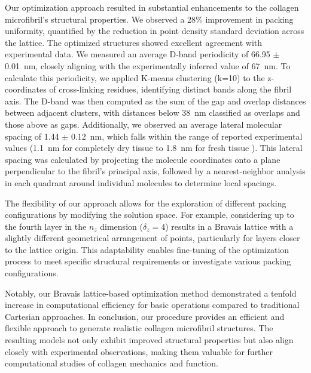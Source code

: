 \documentclass[10pt,letterpaper]{article}
\begin{document}
Our optimization approach resulted in substantial enhancements to the collagen microfibril's structural properties. We observed a 28\% improvement in packing uniformity, quantified by the reduction in point density standard deviation across the lattice. The optimized structures showed excellent agreement with experimental data. We measured an average D-band periodicity of \SI{66.95}{} \(\pm\) \SI{0.01}{\nano\meter}, closely aligning with the experimentally inferred value of \SI{67}{\nano\meter}. To calculate this periodicity, we applied K-means clustering \cite{macqueen1967some, pedregosa2011scikit} (k=10) to the z-coordinates of cross-linking residues, identifying distinct bands along the fibril axis. The D-band was then computed as the sum of the gap and overlap distances between adjacent clusters, with distances below \SI{38}{\nano\meter} classified as overlaps and those above as gaps. Additionally, we observed an average lateral molecular spacing of \SI{1.44}{} \(\pm\) \SI{0.12}{\nano\meter}, which falls within the range of reported experimental values (\SI{1.1}{\nano\meter} for completely dry tissue to \SI{1.8}{\nano\meter} for fresh tissue \cite{fratzl1993collagen}). This lateral spacing was calculated by projecting the molecule coordinates onto a plane perpendicular to the fibril's principal axis, followed by a nearest-neighbor analysis in each quadrant around individual molecules to determine local spacings. 

The flexibility of our approach allows for the exploration of different packing configurations by modifying the solution space. For example, considering up to the fourth layer in the \(n_z\) dimension (\(\delta_z=4\)) results in a Bravais lattice with a slightly different geometrical arrangement of points, particularly for layers closer to the lattice origin. This adaptability enables fine-tuning of the optimization process to meet specific structural requirements or investigate various packing configurations.

Notably, our Bravais lattice-based optimization method demonstrated a tenfold increase in computational efficiency for basic operations compared to traditional Cartesian approaches. In conclusion, our procedure provides an efficient and flexible approach to generate realistic collagen microfibril structures. The resulting models not only exhibit improved structural properties but also align closely with experimental observations, making them valuable for further computational studies of collagen mechanics and function.
\end{document}
